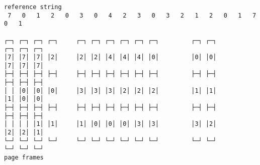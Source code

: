 \documentclass[varwidth=20cm,crop]{standalone}
\begin{document}
\begin{verbatim}
reference string
 7   0   1   2   0   3   0   4   2   3   0   3   2   1   2   0   1   7   0   1

┌─┐ ┌─┐ ┌─┐ ┌─┐     ┌─┐ ┌─┐ ┌─┐ ┌─┐ ┌─┐ ┌─┐         ┌─┐ ┌─┐         ┌─┐ ┌─┐ ┌─┐
│7│ │7│ │7│ │2│     │2│ │2│ │4│ │4│ │4│ │0│         │0│ │0│         │7│ │7│ │7│
├─┤ ├─┤ ├─┤ ├─┤     ├─┤ ├─┤ ├─┤ ├─┤ ├─┤ ├─┤         ├─┤ ├─┤         ├─┤ ├─┤ ├─┤
│ │ │0│ │0│ │0│     │3│ │3│ │3│ │2│ │2│ │2│         │1│ │1│         │1│ │0│ │0│
├─┤ ├─┤ ├─┤ ├─┤     ├─┤ ├─┤ ├─┤ ├─┤ ├─┤ ├─┤         ├─┤ ├─┤         ├─┤ ├─┤ ├─┤
│ │ │ │ │1│ │1│     │1│ │0│ │0│ │0│ │3│ │3│         │3│ │2│         │2│ │2│ │1│
└─┘ └─┘ └─┘ └─┘     └─┘ └─┘ └─┘ └─┘ └─┘ └─┘         └─┘ └─┘         └─┘ └─┘ └─┘
page frames
\end{verbatim}
\end{document}

